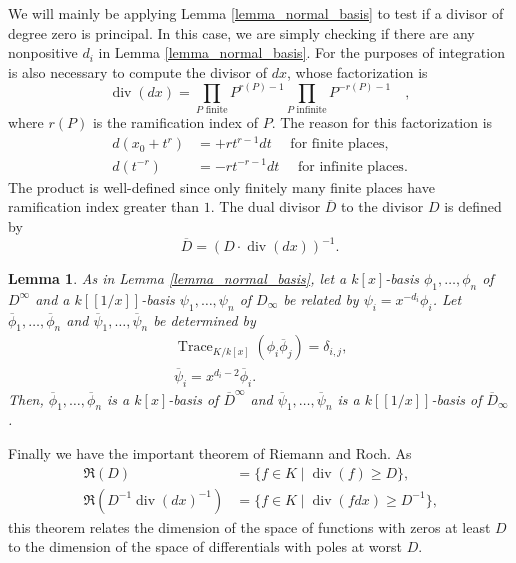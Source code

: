 \documentclass[12pt,reqno]{amsart}
\numberwithin{equation}{section}
\newtheorem{lemma}[theorem]{Lemma}
\newcommand{\op}[1]  { \operatorname{ #1 }}
\newcommand{\goR}[0]  { \mathfrak{R}}
\begin{document}
We will mainly be applying Lemma \ref{lemma_normal_basis} to test if a divisor of degree zero is principal. In this case, we are simply checking if there are any nonpositive $d_i$ in Lemma \ref{lemma_normal_basis}. For the purposes of integration is also necessary to compute the divisor of $dx$, whose factorization is
\begin{equation*}
 \operatorname{div}(dx)= \prod_{P \text{ finite}} P^{r(P)-1} \prod_{P \text{ infinite}} P^{-r(P)-1}\quad{,}
\end{equation*}
where $r(P)$ is the ramification index of $P$. The reason for this factorization is
\begin{align*}
 d(x_0+t^r) &= +r t^{r-1} dt \quad \text{ for finite places}\text{,}\\
 d(t^{-r}) &= -r t^{-r-1} dt \quad \text{ for infinite places}\text{.}
\end{align*}
The product is well-defined since only finitely many finite places have ramification index greater than $1$. The dual divisor $\overline{D}$ to the divisor $D$ is defined by
\begin{equation*}
\overline{D} = (D \cdot \operatorname{div}(dx) )^{-1}\text{.}
\end{equation*}


\begin{lemma}
\label{lemma_complement}
As in Lemma \ref{lemma_normal_basis}, let a $k[x]$-basis $\phi_1,\dots,\phi_n$ of $D^{\infty}$ and a $k[[1/x]]$-basis $\psi_1,\dots,\psi_n$ of $D_{\infty}$ be related by $\psi_i = x^{-d_i}\phi_i$. Let $\overline{\phi}_1,\dots,\overline{\phi}_n$ and $\overline{\psi}_1,\dots,\overline{\psi}_n$ be determined by
\begin{gather}
\operatorname{Trace}_{K/k[x]}(\phi_i \overline{\phi}_j) = \delta_{i,j}\text{,}\\
\overline{\psi}_i = x^{d_i-2} \overline{\phi}_i\text{.}
\end{gather}
Then, $\overline{\phi}_1,\dots,\overline{\phi}_n$ is a $k[x]$-basis of $\overline{D}^{\infty}$ and $\overline{\psi}_1,\dots,\overline{\psi}_n$ is a $k[[1/x]]$-basis of $\overline{D}_{\infty}$.
\end{lemma}

Finally we have the important theorem of Riemann and Roch. As
\begin{align*}
 \goR(D ) &= \{ f \in K \mid \op{div}(f) \ge D \}\text{,}\\
 \goR(D^{-1} \op{div}(dx)^{-1} ) &= \{ f \in K \mid \op{div}(f dx) \ge D^{-1} \}\text{,}
\end{align*}
this theorem relates the dimension of the space of functions with zeros at least $D$ to the dimension of the space of differentials with poles at worst $D$.
\end{document}
